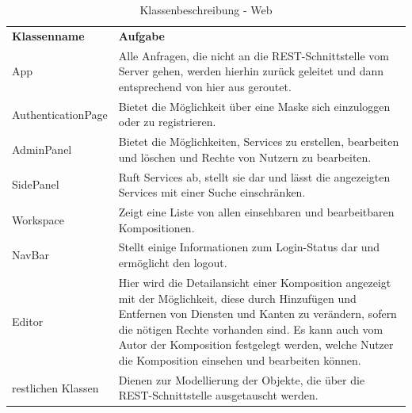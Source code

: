 \begin{table}[h]
	\centering
	\begin{tabularx}{\textwidth}{X X}
		\rowcolor[HTML]{C0C0C0} 
		\textbf{Klassenname} & \textbf{Aufgabe} \\
		App & Alle Anfragen, die nicht an die REST-Schnittstelle vom Server gehen, werden hierhin zurück geleitet
		und dann entsprechend von hier aus geroutet. \\
		\rowcolor[HTML]{E7E7E7} 
		AuthenticationPage & Bietet die Möglichkeit über eine Maske sich einzuloggen oder zu registrieren. \\
		AdminPanel & Bietet die Möglichkeiten, Services zu erstellen, bearbeiten und löschen und Rechte von Nutzern zu bearbeiten. \\
		\rowcolor[HTML]{E7E7E7} 
		SidePanel & Ruft Services ab, stellt sie dar und lässt die angezeigten Services mit einer Suche einschränken. \\
		Workspace & Zeigt eine Liste von allen einsehbaren und bearbeitbaren Kompositionen. \\
		\rowcolor[HTML]{E7E7E7} 
		NavBar & Stellt einige Informationen zum Login-Status dar und ermöglicht den logout. \\
		Editor & Hier wird die Detailansicht einer Komposition angezeigt mit der Möglichkeit, diese durch Hinzufügen und Entfernen von
		Diensten und Kanten zu verändern, sofern die nötigen Rechte vorhanden sind. Es kann auch vom Autor der Komposition festgelegt
		werden, welche Nutzer die Komposition einsehen und bearbeiten können. \\
		\rowcolor[HTML]{E7E7E7} 
		restlichen Klassen & Dienen zur Modellierung der Objekte, die über die REST-Schnittstelle ausgetauscht werden. 
	\end{tabularx}
	\caption{Klassenbeschreibung - Web}
	\label{table:klassenbeschreibung-web}
\end{table}
